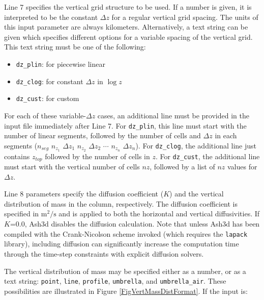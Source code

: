Line 7 specifies the vertical grid structure to be used. If a number is
given, it is interpreted to be the constant $\Delta z$ for a regular vertical
grid spacing.
The units of this input parameter are always kilometers.
Alternatively, a text string can be given which specifies
different options for a variable spacing of the vertical grid. This text
string must be one of the following:
\begin{itemize}
\item \texttt{dz\_plin}: for piecewise linear
\item \texttt{dz\_clog}: for constant $\Delta z$ in $\log z$
\item \texttt{dz\_cust}: for custom
\end{itemize}
For each of these variable-$\Delta z$ cases, an additional line must be
provided in the input file immediately after Line 7. For \texttt{dz\_plin},
this line must start with the number of linear segments, followed by the
number of cells and $\Delta z$ in each segments
($n_{seg}$ $n_{z_1}$ $\Delta z_1$ $n_{z_2}$ $\Delta z_2$ $\cdots$ $n_{z_n}$ $\Delta z_n$).
For \texttt{dz\_clog}, the additional line just contains $z_{top}$ followed by
the number of cells in $z$.
For \texttt{dz\_cust}, the additional line must start with the vertical
number of cells $nz$, followed by a list of $nz$ values for
$\Delta z$.

Line 8 parameters specify the diffusion coefficient ($K$) and the
vertical distribution of mass in the column, respectively. The diffusion
coefficient is specified in $\mathrm{m^2/s}$ and is applied to both the
horizontal and vertical diffusivities. If $K$=0.0, Ash3d disables the
diffusion calculation. Note that unless Ash3d has been
compiled with the Crank-Nicolson scheme invoked (which requires the \texttt{lapack}
library), including diffusion can significantly increase the computation time
through the time-step constraints with explicit diffusion solvers.

The vertical distribution of mass may be specified either as a number, or as a
text string: \texttt{point}, \texttt{line},
\texttt{profile}, \texttt{umbrella}, and \texttt{umbrella\_air}.
These possibilities are illustrated in Figure \ref{FigVertMassDistFormat}. If the input is:

